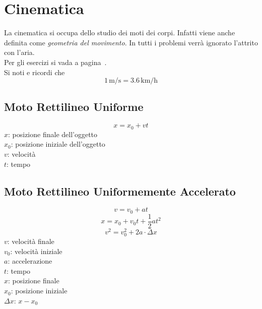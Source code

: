 
\section{Cinematica}\label{sec:cinematica}
La cinematica si occupa dello studio dei moti dei corpi. Infatti viene anche definita come 
\emph{geometria del movimento}. In tutti i problemi verrà ignorato l'attrito con l'aria.\\
Per gli esercizi si vada a pagina~\pageref{ex:cinematica}.\\[\baselineskip]
Si noti e ricordi che
\begin{equation*}
1\,\text{m/s} = 3.6\,\text{km/h}
\end{equation*}

\subsection{Moto Rettilineo Uniforme}\label{subsec:cinematica:mru}
\begin{equation*}
x = x_0 + vt
\end{equation*}
$x$: posizione finale dell'oggetto\\
$x_0$: posizione iniziale dell'oggetto\\
$v$: velocità\\
$t$: tempo

\subsection{Moto Rettilineo Uniformemente Accelerato}
\begin{equation*}
v = v_0 + at
\end{equation*}
\begin{equation*}
x = x_0 + v_0t + \frac{1}{2}at^2
\end{equation*}
\begin{equation*}
v^2 = v_0^2 + 2a\cdot\Delta x
\end{equation*}
$v$: velocità finale\\
$v_0$: velocità iniziale\\
$a$: accelerazione\\
$t$: tempo\\
$x$: posizione finale\\
$x_0$: posizione iniziale\\
$\Delta x$: $x - x_0$

